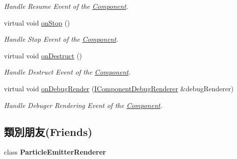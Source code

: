 \begin{DoxyCompactItemize}
\begin{DoxyCompactList}\small\item\em Handle Resume Event of the \hyperlink{class_i_dream_sky_1_1_component}{Component}. \end{DoxyCompactList}\item 
virtual void \hyperlink{class_i_dream_sky_1_1_particle_emitter_ab9e572fca821896a01b3276a77227593}{on\+Stop} ()\hypertarget{class_i_dream_sky_1_1_particle_emitter_ab9e572fca821896a01b3276a77227593}{}\label{class_i_dream_sky_1_1_particle_emitter_ab9e572fca821896a01b3276a77227593}

\begin{DoxyCompactList}\small\item\em Handle Stop Event of the \hyperlink{class_i_dream_sky_1_1_component}{Component}. \end{DoxyCompactList}\item 
virtual void \hyperlink{class_i_dream_sky_1_1_particle_emitter_a2ff7eed6a6075bb8506261a9d1c6d1f9}{on\+Destruct} ()\hypertarget{class_i_dream_sky_1_1_particle_emitter_a2ff7eed6a6075bb8506261a9d1c6d1f9}{}\label{class_i_dream_sky_1_1_particle_emitter_a2ff7eed6a6075bb8506261a9d1c6d1f9}

\begin{DoxyCompactList}\small\item\em Handle Destruct Event of the \hyperlink{class_i_dream_sky_1_1_component}{Component}. \end{DoxyCompactList}\item 
virtual void \hyperlink{class_i_dream_sky_1_1_particle_emitter_abb855f39844e600998adec2736008399}{on\+Debug\+Render} (\hyperlink{class_i_dream_sky_1_1_i_component_debug_renderer}{I\+Component\+Debug\+Renderer} \&debug\+Renderer)\hypertarget{class_i_dream_sky_1_1_particle_emitter_abb855f39844e600998adec2736008399}{}\label{class_i_dream_sky_1_1_particle_emitter_abb855f39844e600998adec2736008399}

\begin{DoxyCompactList}\small\item\em Handle Debuger Rendering Event of the \hyperlink{class_i_dream_sky_1_1_component}{Component}. \end{DoxyCompactList}\end{DoxyCompactItemize}
\subsection*{類別朋友(Friends)}
\begin{DoxyCompactItemize}
\item 
class {\bfseries Particle\+Emitter\+Renderer}\hypertarget{class_i_dream_sky_1_1_particle_emitter_a64372dfc65f9abb9fa48e08862ae224f}{}\label{class_i_dream_sky_1_1_particle_emitter_a64372dfc65f9abb9fa48e08862ae224f}

\end{DoxyCompactItemize}


